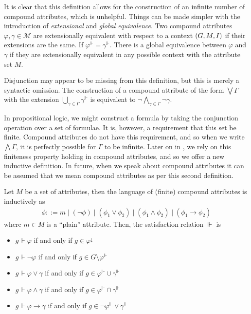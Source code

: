 It is clear that this definition allows for the construction of an infinite number of compound attributes, which is unhelpful. Things can be
made simpler with the introduction of \textit{extensional} and \textit{global equivalence}. Two compound attributes $\varphi, \gamma \in \mathcal{M}$
are extensionally equivalent with respect to a context $(G,M,\mathrel{I})$ if their extensions are the same. If $\varphi^{\Vdash}= \gamma^{\Vdash}$. There
is a global equivalence between $\varphi$ and $\gamma$ if they are extensionally equivalent in any possible context with the attribute set $M$.

Disjunction may appear to be missing from this definition, but this is merely a syntactic omission. The construction of a compound attribute
of the form $\bigvee \Gamma$ with the extension $\underset{\gamma \in \Gamma}\bigcup \gamma^{\Vdash}$ is equivalent to $\neg \underset{\gamma \in \Gamma}
\bigwedge \neg \gamma$.

In propositional logic, we might construct a formula by taking the conjunction operation over a set of formulae. It is, however, a requirement
that this set be finite. Compound attributes do not have this requirement, and so when we write $\bigwedge \Gamma$, it is perfectly possible
for $\Gamma$ to be infinite. Later on in , we rely on this finiteness property holding in compound
attributes, and so we offer a new inductive definition. In future, when we speak about compound attributes it can be assumed that we mean compound
attributes as per this second definition.

\begin{definition}
  \label{definition:compound-attributes-2} Let $M$ be a set of attributes, then the language of (finite) compound attributes is inductively
  as
  \begin{align}
    \phi ::= m \mid (\neg \phi) \mid (\phi_{1}\lor \phi_{2}) \mid (\phi_{1}\land \phi_{2}) \mid (\phi_{1}\rightarrow \phi_{2})
  \end{align}
  where $m \in M$ is a ``plain'' attribute. Then, the satisfaction relation $\Vdash$ is

  \begin{itemize}
    \item $g \Vdash \varphi$ if and only if $g \in \varphi^{\downarrow}$

    \item $g \Vdash \neg \varphi$ if and only if $g \in G \setminus \varphi^{\Vdash}$

    \item $g \Vdash \varphi \lor \gamma$ if and only if $g \in \varphi^{\Vdash}\cup \gamma^{\Vdash}$

    \item $g \Vdash \varphi \land \gamma$ if and only if $g \in \varphi^{\Vdash}\cap \gamma^{\Vdash}$

    \item $g \Vdash \varphi \rightarrow \gamma$ if and only if $g \in \neg \varphi^{\Vdash}\lor \gamma^{\Vdash}$
  \end{itemize}
\end{definition}

